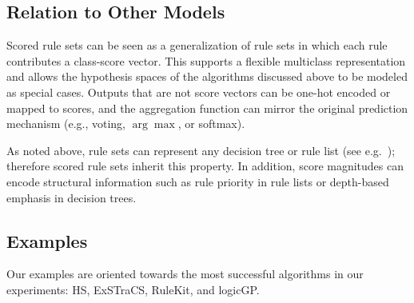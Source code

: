 \documentclass[a4paper,twoside]{article}
\begin{document}
\subsection{Relation to Other Models}

Scored rule sets can be seen as a generalization of rule sets in which each rule contributes a class-score vector. This supports a flexible multiclass representation and allows the hypothesis spaces of the algorithms discussed above to be modeled as special cases. Outputs that are not score vectors can be one-hot encoded or mapped to scores, and the aggregation function can mirror the original prediction mechanism (e.g., voting, $\arg\max$, or softmax).


As noted above, rule sets can represent any decision tree or rule list (see e.g.\ \cite{witten2025data}); therefore scored rule sets inherit this property. In addition, score magnitudes can encode structural information such as rule priority in rule lists or depth-based emphasis in decision trees.



\subsection{Examples}

Our examples are oriented towards the most successful algorithms in our experiments: HS, ExSTraCS, RuleKit, and logicGP. 
\end{document}
